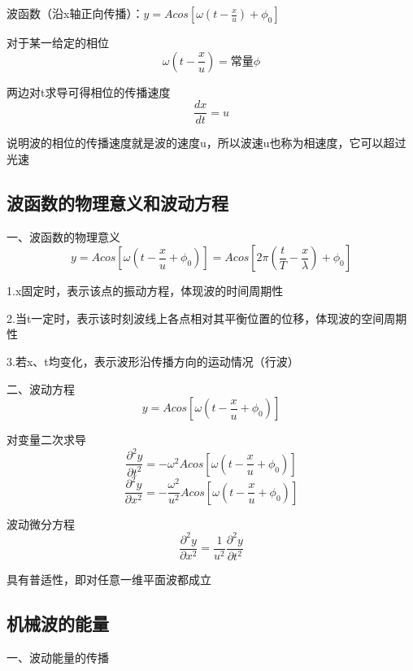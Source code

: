 \documentclass[UTF8]{article}
\begin{document}
    波函数（沿x轴正向传播）：$y = Acos[\omega(t - \frac{x}{u}) + \phi_0]$

    对于某一给定的相位
    \[\omega (t - \frac{x}{u}) = \mbox{常量}\phi\]

    两边对t求导可得相位的传播速度
    \[\frac{dx}{dt} = u\]

    说明波的相位的传播速度就是波的速度u，所以波速u也称为相速度，它可以超过光速

\subsection{波函数的物理意义和波动方程}

    一、波函数的物理意义
    \[y = Acos[\omega(t - \frac{x}{u} + \phi_0)] = Acos[2\pi(\frac{t}{T} - \frac{x}{\lambda}) + \phi_0]\]

    1.x固定时，表示该点的振动方程，体现波的时间周期性

    2.当t一定时，表示该时刻波线上各点相对其平衡位置的位移，体现波的空间周期性

    3.若x、t均变化，表示波形沿传播方向的运动情况（行波）

    二、波动方程
    \[y = Acos[\omega(t - \frac{x}{u} + \phi_0)]\]

    对变量二次求导
    \[\frac{\partial^2y}{\partial t^2} = -\omega^2Acos[\omega(t - \frac{x}{u} + \phi_0)]\]
    \[\frac{\partial^2y}{\partial x^2} = -\frac{\omega^2}{u^2}Acos[\omega(t - \frac{x}{u} + \phi_0)]\]

    波动微分方程
    \[\frac{\partial^2y}{\partial x^2} = \frac{1}{u^2}\frac{\partial^2y}{\partial t^2}\]

    具有普适性，即对任意一维平面波都成立

\subsection{机械波的能量}

    一、波动能量的传播
\end{document}
